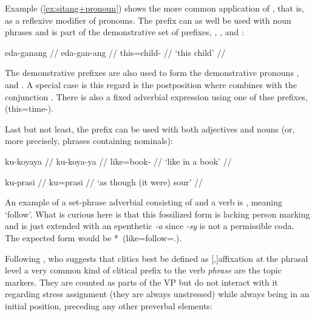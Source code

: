 Example (\ref{ex:sitang+pronoun}) shows the more common application of 
, that is, as a reflexive modifier of pronouns. The 
prefix  can as well be used with noun phrases and is part of the 
demonstrative set of prefixes, , , and 
:

\ex\begingl
	\gla eda-ganang //
	\glb eda-gan-ang //
	\glc this=child-\Aarg{} //
	\glft `this child' //
\endgl\xe

The demonstrative prefixes are also used to form the demonstrative 
pronouns , 
 and . A special case is 
this regard is the postposition  
where  combines with the conjunction . There is also a fixed adverbial expression using one of 
thse prefixes,  
(this=time-\Dat{}).

Last but not least, the prefix  can be used 
with both adjectives and nouns (or, more precisely, phrases containing 
nominals):

\begin{multicols}{2}
\pex
\a\begingl
	\gla ku-koyaya //
	\glb ku-koya-ya //
	\glc like=book-\Loc{} //
	\glft `like in a book' //
\endgl

\a\begingl
	\gla ku-prasi //
	\glb ku=prasi //
	\glft `as though (it were) sour' //
\endgl
\xe
\end{multicols}

An example of a set-phrase adverbial consisting of  and a verb 
is ,  meaning `follow'. 
What is curious here is that this fossilized form is lacking person marking 
and is just extended with an epenthetic \textit{-a} since \textit{-sy} is not 
a permissible coda. The expected form would be 
*\, (like=follow=\TsgI{}.\Aarg{}).

Following \citet{klavans1985}, who suggests that clitics best be defined as 
[,]{affixation at the phrasal level} a very common 
kind of clitical prefix to the verb \emph{phrase} are the topic markers. They 
are counted as parts of the VP but do not interact with it regarding stress 
assignment (they are always unstressed) while always being in an initial 
position, preceding any other preverbal elements:

